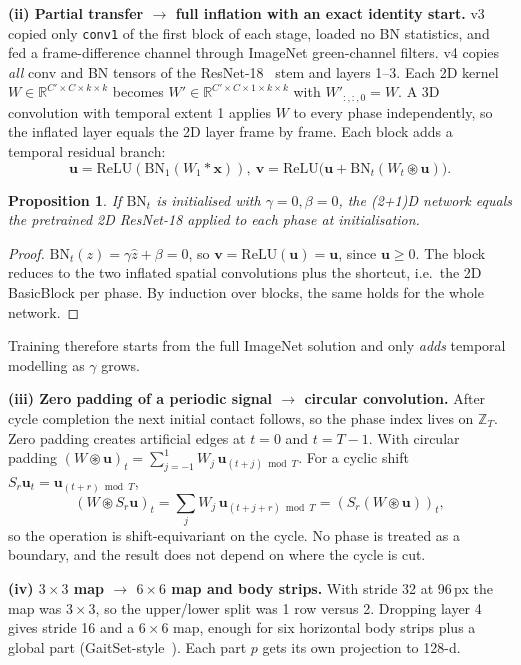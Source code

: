 \documentclass[conference]{IEEEtran}
\newtheorem{proposition}{Proposition}
\newcommand{\R}{\mathbb{R}}
\begin{document}
\textbf{(ii) Partial transfer $\rightarrow$ full inflation with an exact
identity start.} v3 copied only \texttt{conv1} of the first block of each stage,
loaded no BN statistics, and fed a frame-difference channel through ImageNet
green-channel filters. v4 copies \emph{all} conv and BN tensors of the ResNet-18~\cite{he2016resnet}
stem and layers 1--3. Each 2D kernel $W\in\R^{C'\times C\times k\times k}$
becomes $W'\in\R^{C'\times C\times 1\times k\times k}$ with $W'_{:,:,0}=W$. A
3D convolution with temporal extent 1 applies $W$ to every phase independently,
so the inflated layer equals the 2D layer frame by frame. Each block adds a
temporal residual branch:
\begin{equation}
\mathbf{u}=\mathrm{ReLU}(\mathrm{BN}_1(W_1*\mathbf{x})),\
\mathbf{v}=\mathrm{ReLU}\big(\mathbf{u}+\mathrm{BN}_t(W_t\circledast\mathbf{u})\big).
\end{equation}
\begin{proposition}
If $\mathrm{BN}_t$ is initialised with $\gamma=0,\beta=0$, the (2+1)D network
equals the pretrained 2D ResNet-18 applied to each phase at initialisation.
\end{proposition}
\begin{proof}
$\mathrm{BN}_t(z)=\gamma\hat{z}+\beta=0$, so
$\mathbf{v}=\mathrm{ReLU}(\mathbf{u})=\mathbf{u}$, since
$\mathbf{u}\ge 0$. The block reduces to the two inflated spatial convolutions
plus the shortcut, i.e.\ the 2D BasicBlock per phase. By induction over blocks,
the same holds for the whole network.
\end{proof}
Training therefore starts from the full ImageNet solution and only \emph{adds}
temporal modelling as $\gamma$ grows.

\textbf{(iii) Zero padding of a periodic signal $\rightarrow$ circular
convolution.} After cycle completion the next initial contact follows, so the
phase index lives on $\mathbb{Z}_T$. Zero padding creates artificial edges at
$t=0$ and $t=T-1$. With circular padding
$(W\circledast\mathbf{u})_t=\sum_{j=-1}^{1}W_j\,\mathbf{u}_{(t+j)\bmod T}$. For
a cyclic shift $S_r\mathbf{u}_t=\mathbf{u}_{(t+r)\bmod T}$,
\begin{equation}
(W\circledast S_r\mathbf{u})_t=\textstyle\sum_j W_j\,\mathbf{u}_{(t+j+r)\bmod T}
=(S_r(W\circledast\mathbf{u}))_t ,
\end{equation}
so the operation is shift-equivariant on the cycle. No phase is treated as a
boundary, and the result does not depend on where the cycle is cut.

\textbf{(iv) $3\times3$ map $\rightarrow$ $6\times6$ map and body strips.} With
stride 32 at 96\,px the map was $3\times3$, so the upper/lower split was 1 row
versus 2. Dropping layer 4 gives stride 16 and a $6\times6$ map, enough for six
horizontal body strips plus a global part (GaitSet-style~\cite{chao2019gaitset}).
Each part $p$ gets its own projection to 128-d.
\end{document}
